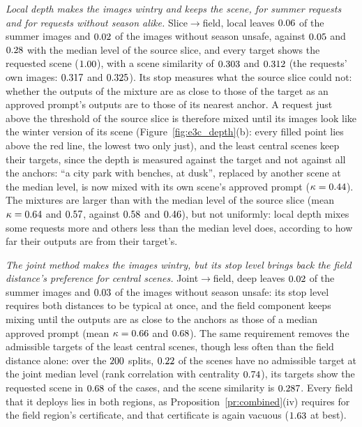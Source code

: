 \documentclass{article}
\theoremstyle{plain}
\theoremstyle{remark}
\begin{document}
\emph{Local depth makes the images wintry and keeps the scene, for summer requests and for requests without season alike.}
Slice$\to$field, local leaves $0.06$ of the summer images and $0.02$ of the images without season unsafe,
against $0.05$ and $0.28$ with the median level of the source slice, and every target shows the requested scene
($1.00$), with a scene similarity of $0.303$ and $0.312$ (the requests' own images: $0.317$ and
$0.325$). Its stop measures what the source slice could not: whether the outputs of the mixture are as close to those of
the target as an approved prompt's outputs are to those of its nearest anchor. A request just above the threshold of the source slice
is therefore mixed until its images look like the winter version of its scene (Figure~\ref{fig:e3c_depth}(b): every filled point
lies above the red line, the lowest two only just), and the least central scenes keep their targets, since the depth is measured against the target and not
against all the anchors: ``a city park with benches, at dusk'', replaced by another scene at the median level, is now mixed with its
own scene's approved prompt ($\kappa=0.44$). The mixtures are larger than with the median level of the source slice (mean
$\kappa=0.64$ and $0.57$, against $0.58$ and $0.46$), but not uniformly: local depth
mixes some requests more and others less than the median level does, according to how far their outputs are from their target's.

\emph{The joint method makes the images wintry, but its stop level brings back the field distance's preference for central scenes.}
Joint$\to$field, deep leaves $0.02$ of the summer images and $0.03$ of the images without season unsafe: its
stop level requires both distances to be typical at once, and the field component keeps mixing until the outputs are as close to the
anchors as those of a median approved prompt (mean $\kappa=0.66$ and $0.68$). The same requirement removes the
admissible targets of the least central scenes, though less often than the field distance alone: over the $200$ splits,
$0.22$ of the scenes have no admissible target at the joint median level (rank correlation with centrality
$0.74$), its targets show the requested scene in $0.68$ of the cases, and the scene similarity is $0.287$.
Every field that it deploys lies in both regions, as Proposition~\ref{pr:combined}(iv) requires for the field region's certificate,
and that certificate is again vacuous ($1.63$ at best).
\end{document}
